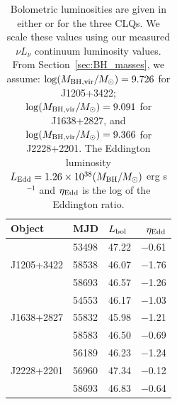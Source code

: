 \documentclass[fleqn,usenatbib]{mnras}
\begin{document}
\begin{table}
  \centering
  \begin{tabular}{l l l r}
    \hline
    \hline
    Object       & MJD & $L_{\rm bol}$&  $\eta_{\rm Edd}$  \\
    \hline
                     & 53498 & 47.22     &  $-$0.61   \\
 J1205+3422 & 58538 &  46.07    &   $-$1.76  \\   %
                     & 58693 &  46.57    &  $-$1.26  \\                    
    \hline 
                     & 54553 & 46.17   & $-$1.03  \\
J1638+2827  & 55832 & 45.98   & $-$1.21  \\      %
                     & 58583 & 46.50   & $-$0.69   \\
    \hline 
                     & 56189  & 46.23  &  $-$1.24 \\
J2228+2201  & 56960 & 47.34  & $-$0.12  \\      %
                     & 58693 & 46.83   &  $-$0.64 \\
    \hline
    \hline
  \end{tabular}
  \caption{Bolometric luminosities are given in either \citet{Shen2011} or
    \citet{Kozlowski2017} for the three CLQs. We scale these values using
    our measured $\nu L_{\nu}$ continuum luminosity values.  From
    Section~\ref{sec:BH_masses}, we assume: $\log(M_{\rm BH,
      vir}/M_{\odot}) = 9.726$ for J1205+3422; $\log(M_{\rm BH,
      vir}/M_{\odot}) = 9.091$ for J1638+2827, and $\log(M_{\rm BH,
      vir}/M_{\odot}) = 9.366$ for J2228+2201.  The Eddington luminosity
    $L_{\rm Edd} = 1.26\times10^{38} (M_{\rm BH}/M_{\odot})$ erg s$^{-1}$
    and $\eta_{\rm Edd}$ is the log of the Eddington ratio.}
\label{tab:Eddington_ratios} 
\end{table}
\end{document}
